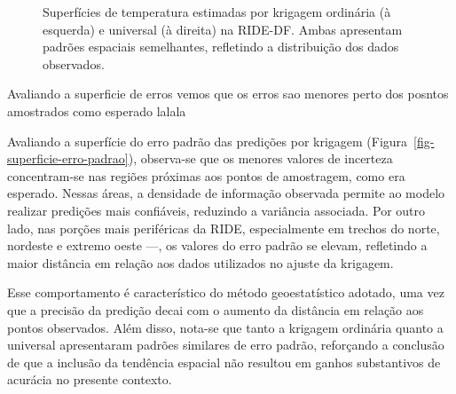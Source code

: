 \documentclass[
  letterpaper,
  DIV=11,
  numbers=noendperiod]{scrartcl}
\begin{document}
\label{cell-fig-krigagem-comparacao}
\begin{figure}[H]


\caption{\label{fig-krigagem-comparacao}Superfícies de temperatura
estimadas por krigagem ordinária (à esquerda) e universal (à direita) na
RIDE-DF. Ambas apresentam padrões espaciais semelhantes, refletindo a
distribuição dos dados observados.}

\end{figure}%

Avaliando a superficie de erros vemos que os erros sao menores perto dos
posntos amostrados como esperado lalala

Avaliando a superfície do erro padrão das predições por krigagem
(Figura~\ref{fig-superficie-erro-padrao}), observa-se que os menores
valores de incerteza concentram-se nas regiões próximas aos pontos de
amostragem, como era esperado. Nessas áreas, a densidade de informação
observada permite ao modelo realizar predições mais confiáveis,
reduzindo a variância associada. Por outro lado, nas porções mais
periféricas da RIDE, especialmente em trechos do norte, nordeste e
extremo oeste ---, os valores do erro padrão se elevam, refletindo a
maior distância em relação aos dados utilizados no ajuste da krigagem.

Esse comportamento é característico do método geoestatístico adotado,
uma vez que a precisão da predição decai com o aumento da distância em
relação aos pontos observados. Além disso, nota-se que tanto a krigagem
ordinária quanto a universal apresentaram padrões similares de erro
padrão, reforçando a conclusão de que a inclusão da tendência espacial
não resultou em ganhos substantivos de acurácia no presente contexto.
\end{document}
